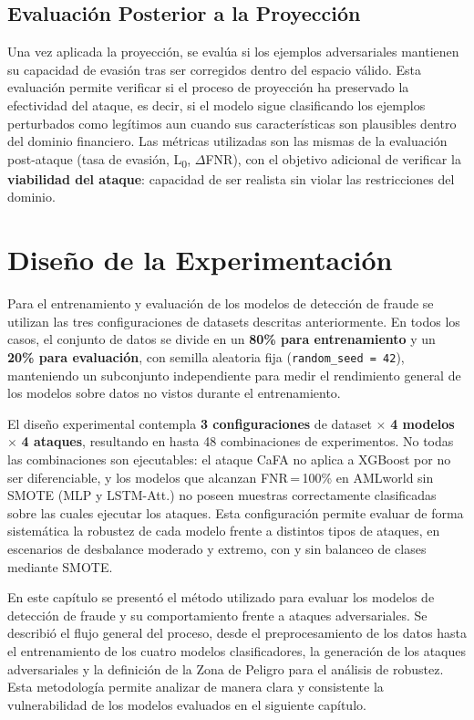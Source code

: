 \subsection{Evaluación Posterior a la Proyección}

Una vez aplicada la proyección, se evalúa si los ejemplos adversariales mantienen su capacidad de evasión tras ser corregidos dentro del espacio válido. Esta evaluación permite verificar si el proceso de proyección ha preservado la efectividad del ataque, es decir, si el modelo sigue clasificando los ejemplos perturbados como legítimos aun cuando sus características son plausibles dentro del dominio financiero. Las métricas utilizadas son las mismas de la evaluación post-ataque (tasa de evasión, L\textsubscript{0}, $\Delta$FNR), con el objetivo adicional de verificar la \textbf{viabilidad del ataque}: capacidad de ser realista sin violar las restricciones del dominio.

\section{Diseño de la Experimentación}

Para el entrenamiento y evaluación de los modelos de detección de fraude se utilizan las tres configuraciones de datasets descritas anteriormente. En todos los casos, el conjunto de datos se divide en un \textbf{80\% para entrenamiento} y un \textbf{20\% para evaluación}, con semilla aleatoria fija (\texttt{random\_seed = 42}), manteniendo un subconjunto independiente para medir el rendimiento general de los modelos sobre datos no vistos durante el entrenamiento.

El diseño experimental contempla \textbf{3 configuraciones} de dataset $\times$ \textbf{4 modelos} $\times$ \textbf{4 ataques}, resultando en hasta 48 combinaciones de experimentos. No todas las combinaciones son ejecutables: el ataque CaFA no aplica a XGBoost por no ser diferenciable, y los modelos que alcanzan FNR\,=\,100\% en AMLworld sin SMOTE (MLP y LSTM-Att.) no poseen muestras correctamente clasificadas sobre las cuales ejecutar los ataques. Esta configuración permite evaluar de forma sistemática la robustez de cada modelo frente a distintos tipos de ataques, en escenarios de desbalance moderado y extremo, con y sin balanceo de clases mediante SMOTE.

\vspace{1em}
En este capítulo se presentó el método utilizado para evaluar los modelos de detección de fraude y su comportamiento frente a ataques adversariales. Se describió el flujo general del proceso, desde el preprocesamiento de los datos hasta el entrenamiento de los cuatro modelos clasificadores, la generación de los ataques adversariales y la definición de la Zona de Peligro para el análisis de robustez. Esta metodología permite analizar de manera clara y consistente la vulnerabilidad de los modelos evaluados en el siguiente capítulo.

